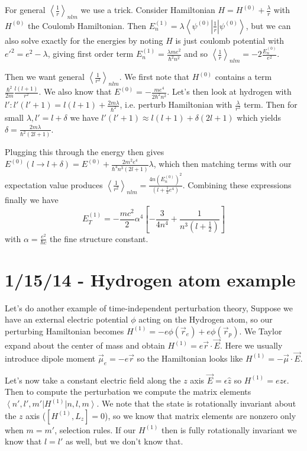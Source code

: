 \documentclass[10pt]{report}
\newcommand{\bra}[1]{\left<#1\right|}
\newcommand{\ket}[1]{\left|#1\right>}
\newcommand{\expvalue}[1]{\left<#1\right>}
\begin{document}
For general $\expvalue{\frac{1}{r}}_{nlm}$ we use a trick. Consider Hamiltonian $H = H^{(0)} + \frac{\lambda}{r}$ with $H^{(0)}$ the Coulomb Hamiltonian. Then $E_{n}^{(1)} = \lambda\bra{\psi^{(0)}}\frac{1}{r}\ket{\psi^{(0)}}$, but we can also solve exactly for the energies by noting $H$ is just coulomb potential with $e'^2 = e^2-\lambda$, giving first order term $E_n^{(1)} = \frac{\lambda me^2}{\hbar^2 n^2}$ and so $\expvalue{\frac{1}{r}}_{nlm} = -2\frac{E_n^{(0)}}{e^2}$.

Then we want general $\expvalue{\frac{1}{r^2}}_{nlm}$. We first note that $H^{(0)}$ contains a term $\frac{\hbar^2}{2m}\frac{l(l+1)}{r^2}$. We also know that $E^{(0)} = -\frac{me^4}{2\hbar^2 n^2}$. Let's then look at hydrogen with $l': l'(l' + 1) = l(l+1) + \frac{2m\lambda}{\hbar^2}$, i.e. perturb Hamiltonian with $\frac{\lambda}{r^2}$ term. Then for small $\lambda, l' = l + \delta$ we have $l'(l' + 1) \approx l(l+1) + \delta(2l+1)$ which yields $\delta = \frac{2m\lambda}{\hbar^2(2l+1)}$.

Plugging this through the energy then gives $E^{(0)}(l \to l + \delta) = E^{(0)} + \frac{2m^2e^4}{\hbar^4 n^3(2l+1)}\lambda$, which then matching terms with our expectation value produces $\expvalue{\frac{1}{r^2}}_{nlm} = \frac{4n(E_n^{(0)})^2}{\left( l+\frac{1}{2} e^4 \right)}$. Combining these expressions finally we have
\begin{equation}
    E_T^{(1)} = -\frac{mc^2}{2}\alpha^4\left[ -\frac{3}{4n^4} + \frac{1}{n^3\left( l+\frac{1}{2} \right)} \right]
    \label{1.13.fs}
\end{equation}
with $\alpha = \frac{e^2}{\hbar c}$ the fine structure constant.

\chapter{1/15/14 - Hydrogen atom example}

Let's do another example of time-independent perturbation theory, Suppose we have an external electric potential $\phi$ acting on the Hydrogen atom, so our perturbing Hamiltonian becomes $H^{(1)} = -e\phi(\vec{r}_e) + e\phi(\vec{r}_p)$. We Taylor expand about the center of mass and obtain $H^{(1)} = e\vec{r}\cdot \vec{E}$. Here we usually introduce dipole moment $\vec{\mu}_e = -e \vec{r}$ so the Hamiltonian looks like $H^{(1)} = -\vec{\mu}\cdot \vec{E}$.

Let's now take a constant electric field along the $z$ axis $\vec{E} = \epsilon \hat{z}$ so $H^{(1)} = ez\epsilon$. Then to compute the perturbation we compute the matrix elements $\bra{n',l',m'}H^{(1)}\ket{n,l,m}$. We note that the state is rotationally invariant about the $z$ axis ($[H^{(1)},L_z] = 0$), so we know that matrix elements are nonzero only when $m = m'$, selection rules. If our $H^{(1)}$ then is fully rotationally invariant we know that $l=l'$ as well, but we don't know that.
\end{document}
